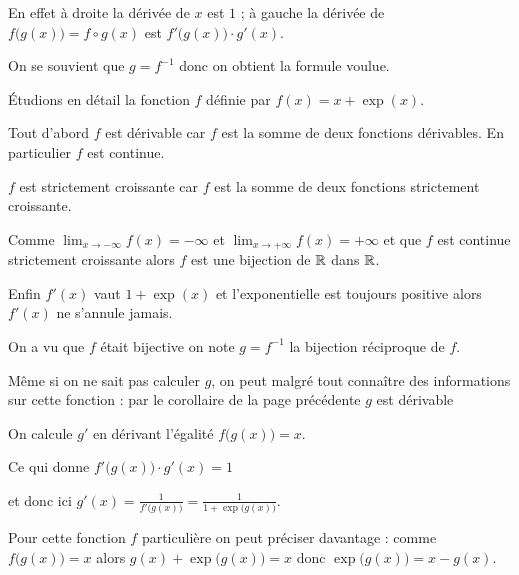 En effet à droite la dérivée de $x$ est $1$ ;
à gauche la dérivée de $f\big( g(x) \big) = f \circ g(x)$ est $f'\big(g(x)\big) \cdot g'(x)$.

\change

On se souvient que $g=f^{-1}$ donc on obtient la formule voulue.


\diapo

\change

\'Etudions en détail la fonction $f$ définie par $f(x)=x+\exp(x)$.

\change

Tout d'abord $f$ est dérivable 
car $f$ est la somme de deux fonctions dérivables. En particulier $f$ est continue.

\change

$f$ est strictement croissante car $f$ est la somme de deux fonctions strictement croissante.

\change

Comme $\lim_{x\to-\infty} f(x)=-\infty$ et $\lim_{x\to+\infty} f(x)=+\infty$ 
et que $f$ est continue strictement croissante alors $f$ est une bijection de $\mathbb{R}$ dans $\mathbb{R}$.

\change

Enfin $f'(x)$ vaut $1 + \exp(x)$ et l'exponentielle est toujours positive alors $f'(x)$ ne s'annule jamais.

\change



On a vu que $f$ était bijective on note $g = f^{-1}$ la bijection réciproque de $f$. 

\change

Même si on ne sait pas calculer $g$, on peut malgré tout connaître des informations sur 
cette fonction : par le corollaire de la page précédente $g$ est dérivable



On calcule $g'$ en dérivant l'égalité $f\big( g(x) \big)  = x$. 

\change

Ce qui donne 
$f'\big(g(x)\big) \cdot g'(x) = 1$

\change

et donc ici 
$g'(x) = \frac{1}{f'\big( g(x) \big)} = \frac{1}{1+\exp\big( g(x) \big)}.$

\change

Pour cette fonction $f$ particulière on peut préciser davantage :
comme  $f\big( g(x)\big) = x$ alors $g(x)+\exp\big( g(x) \big)=x$ donc 
$\exp\big( g(x) \big)=x-g(x)$. 

